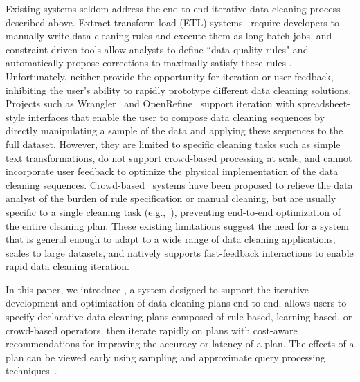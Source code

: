 Existing systems seldom address the end-to-end iterative data cleaning process described above.
Extract-transform-load (ETL) systems~\cite{informatica,talend,apachefalcon} require developers to manually write data cleaning rules and execute them as long batch jobs, 
and constraint-driven tools allow analysts to define ``data quality rules" and automatically propose corrections to maximally satisfy these rules \cite{DBLP:conf/sigmod/DallachiesaEEEIOT13}.
Unfortunately, neither provide the opportunity for iteration or user feedback, inhibiting the user's ability to rapidly prototype different data cleaning solutions.
Projects such as Wrangler~\cite{wrangler,trifacta} and OpenRefine~\cite{openrefine} support iteration with spreadsheet-style interfaces that enable the user to compose data cleaning sequences by directly manipulating a sample of the data and applying these sequences to the full dataset.
However, they are limited to specific cleaning tasks such as simple text transformations, do not support crowd-based processing at scale, and cannot incorporate user feedback to optimize the physical implementation of the data cleaning sequences.
Crowd-based~\cite{gokhale2014corleone,stonebraker2013data} systems have been proposed to relieve the data analyst of the burden of rule specification or manual cleaning, but are usually specific to a single cleaning task (e.g.,~\cite{gokhale2014corleone,park2014crowdfill,eracer,chen2014integrating}), preventing end-to-end optimization of the entire cleaning plan.
These existing limitations suggest the need for a system that is general enough to adapt to a wide range of data cleaning applications, scales to large datasets, and natively supports fast-feedback interactions to enable rapid data cleaning iteration.

In this paper, we introduce \sys, a system designed to support the iterative development and optimization of data cleaning plans end to end.
\sys allows users to specify declarative data cleaning plans composed of rule-based, learning-based, or crowd-based operators, then iterate rapidly on plans with cost-aware recommendations for improving the accuracy or latency of a plan.
The effects of a plan can be viewed early using sampling and approximate query processing techniques~\cite{wang1999sample}.

